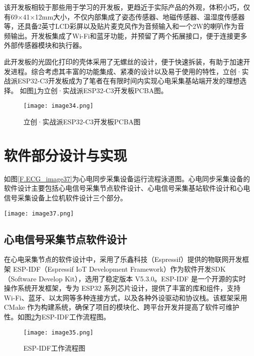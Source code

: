 该开发板相较于那些用于学习的开发板，更趋近于实际产品的外观，体积小巧，仅有69×41×12mm大小，不仅内部集成了姿态传感器、地磁传感器、温湿度传感器等，还具备2英寸LCD彩屏以及贴片麦克风作为音频输入和一个2W的喇叭作为音频输出。开发板集成了Wi-Fi和蓝牙功能，并预留了两个拓展接口，便于连接更多外部传感器模块和执行器。

此开发板的光固化打印的壳体采用了无螺丝的设计，便于快速拆装，有助于加速开发进程。综合考虑其丰富的功能集成、紧凑的设计以及易于使用的特性，立创·实战派ESP32-C3开发板成为了笔者在有限时间内实现心电采集基站端开发的理想选择。 如图\ref{F.ECG_image34}为立创·实战派ESP32-C3开发板PCBA图。

\begin{figure}[htb]
    \centering
    \texttt{[image: image34.png]}
    \caption{立创·实战派ESP32-C3开发板PCBA图}
    \label{F.ECG_image34}
\end{figure}

\section{软件部分设计与实现}

如图\ref{F.ECG_image37}为心电同步采集设备运行流程泳道图。心电同步采集设备的软件设计主要包括心电信号采集节点软件设计、心电信号采集基站软件设计和心电信号采集设备上位机软件设计三个部分。

\begin{sidewaysfigure}
    \centering
    \texttt{[image: image37.png]}
    \caption{心电同步采集设备运行流程泳道图}
    \label{F.ECG_image37}
\end{sidewaysfigure}

\subsection{心电信号采集节点软件设计}

在心电采集节点的软件设计中，采用了乐鑫科技（Espressif）提供的物联网开发框架 ESP-IDF（Espressif IoT Development Framework）作为软件开发SDK（Software Develop Kit），选用了稳定版本 V5.3.0。ESP-IDF 是一个开源的实时操作系统开发框架，专为 ESP32 系列芯片设计，提供了丰富的库和组件，支持 Wi-Fi、蓝牙、以太网等多种连接方式，以及各种外设驱动和协议栈。该框架采用 CMake 作为构建系统，确保了项目的模块化、跨平台开发并提高了软件可维护性。如图\ref{F.ECG_image35}为ESP-IDF工作流程图。

\begin{figure}[H]
    \centering
    \texttt{[image: image35.png]}
    \caption{ESP-IDF工作流程图\cite{espressif2025espidf}}
    \label{F.ECG_image35}
\end{figure}

